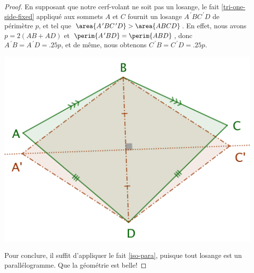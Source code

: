 \begin{proof}
	
	En supposant que notre cerf-volant ne soit pas un losange, le fait \ref{tri-one-side-fixed} appliqué aux sommets $A$ et $C$ fournit un losange $A^{\,\prime}BC^{\,\prime}D$ de périmètre $p$, et tel que $\area{A^{\,\prime}BC^{\,\prime}D} > \area{ABCD}$.
	En effet, nous avons
	$p = 2(AB + AD)$
	et
	$\perim{A^{\,\prime}BD} = \perim{ABD}$,
	donc
	$A^{\,\prime}B = A^{\,\prime}D = \num{.25} p$,
	et de même, nous obtenons
	$C^{\,\prime}B = C^{\,\prime}D = \num{.25} p$.

	\begin{center}
		\includegraphics[scale=.4]{content/quadrilateral/convex-isopaire.png}
	\end{center}
	
	
	Pour conclure, il suffit d'appliquer le fait \ref{iso-para}, puisque tout losange est un parallélogramme. Que la géométrie est belle!
\end{proof}

